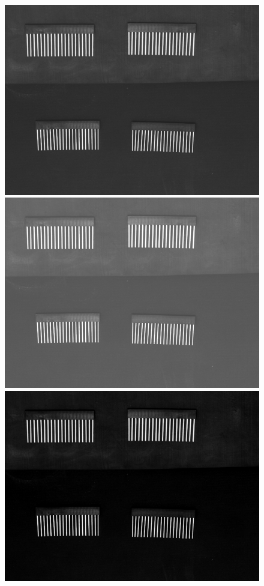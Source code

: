 \documentclass{scrreprt}
\begin{document}
\begin{center}
\begin{figure}[!h]
\includegraphics[scale=0.5]{images/ConnectOK.png}\hfill
\includegraphics[scale=0.5]{images/ConnectL.png}\hfill
\includegraphics[scale=0.5]{images/ConnectD.png}

\end{figure}
\end{center}
\end{document}
